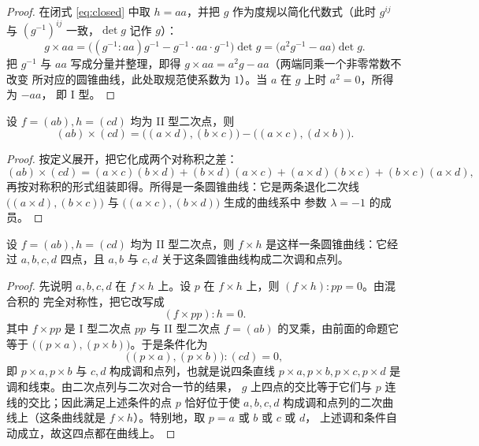 \begin{proof}
在闭式 \eqref{eq:closed} 中取 $h=aa$，并把 $g$ 作为度规以简化代数式（此时 $g^{ij}$ 与
$(g^{-1})^{ij}$ 一致，$\det g$ 记作 $g$）：
\[
g\times aa=\big((g^{-1}:aa)g^{-1}-g^{-1}\cdot aa\cdot g^{-1}\big)\det g
=\big(a^2g^{-1}-aa\big)\det g .
\]
把 $g^{-1}$ 与 $aa$ 写成分量并整理，即得 $g\times aa=a^2g-aa$（两端同乘一个非零常数不改变
所对应的圆锥曲线，此处取规范使系数为 $1$）。当 $a$ 在 $g$ 上时 $a^2=0$，所得为 $-aa$，
即 I 型。
\end{proof}

\begin{proposition}
设 $f=(ab),h=(cd)$ 均为 II 型二次点，则
\[
(ab)\times(cd)=\big((a\times d),(b\times c)\big)-\big((a\times c),(d\times b)\big).
\]
\end{proposition}

\begin{proof}
按定义展开，把它化成两个对称积之差：
\[
(ab)\times(cd)=(a\times c)(b\times d)+(b\times d)(a\times c)
+(a\times d)(b\times c)+(b\times c)(a\times d),
\]
再按对称积的形式组装即得。所得是一条圆锥曲线：它是两条退化二次线
$\big((a\times d),(b\times c)\big)$ 与 $\big((a\times c),(b\times d)\big)$ 生成的曲线系中
参数 $\lambda=-1$ 的成员。
\end{proof}

\begin{proposition}
\label{prop:ii-ii}
设 $f=(ab),h=(cd)$ 均为 II 型二次点，则 $f\times h$ 是这样一条圆锥曲线：它经过 $a,b,c,d$
四点，且 $a,b$ 与 $c,d$ 关于这条圆锥曲线构成二次调和点列。
\end{proposition}

\begin{proof}
先说明 $a,b,c,d$ 在 $f\times h$ 上。设 $p$ 在 $f\times h$ 上，则 $(f\times h):pp=0$。由混合积的
完全对称性，把它改写成
\[
(f\times pp):h=0 .
\]
其中 $f\times pp$ 是 I 型二次点 $pp$ 与 II 型二次点 $f=(ab)$ 的叉乘，由前面的命题它等于
$\big((p\times a),(p\times b)\big)$。于是条件化为
\[
\big((p\times a),(p\times b)\big):(cd)=0 ,
\]
即 $p\times a,p\times b$ 与 $c,d$ 构成调和点列，也就是说四条直线
$p\times a,p\times b,p\times c,p\times d$ 是调和线束。由二次点列与二次对合一节的结果，
$g$ 上四点的交比等于它们与 $p$ 连线的交比；因此满足上述条件的点 $p$ 恰好位于使 $a,b,c,d$
构成调和点列的二次曲线上（这条曲线就是 $f\times h$）。特别地，取 $p=a$ 或 $b$ 或 $c$ 或 $d$，
上述调和条件自动成立，故这四点都在曲线上。
\end{proof}


